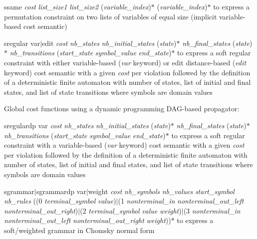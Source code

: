 \documentclass{article}
\begin{document}
\begin{DoxyItemize}
\begin{DoxyItemize}
\item ssame {\itshape cost} {\itshape list\-\_\-size1} {\itshape list\-\_\-size2} ({\itshape variable\-\_\-index})$\ast$ ({\itshape variable\-\_\-index})$\ast$ to express a permutation constraint on two lists of variables of equal size (implicit variable-\/based cost semantic)
\item sregular var$\vert$edit {\itshape cost} {\itshape nb\-\_\-states} {\itshape nb\-\_\-initial\-\_\-states} ({\itshape state})$\ast$ {\itshape nb\-\_\-final\-\_\-states} ({\itshape state})$\ast$ {\itshape nb\-\_\-transitions} ({\itshape start\-\_\-state} {\itshape symbol\-\_\-value} {\itshape end\-\_\-state})$\ast$ to express a soft regular constraint with either variable-\/based ({\itshape var} keyword) or edit distance-\/based ({\itshape edit} keyword) cost semantic with a given {\itshape cost} per violation followed by the definition of a deterministic finite automaton with number of states, list of initial and final states, and list of state transitions where symbols are domain values
\end{DoxyItemize}
\item Global cost functions using a dynamic programming D\-A\-G-\/based propagator\-:
\begin{DoxyItemize}
\item sregulardp var {\itshape cost} {\itshape nb\-\_\-states} {\itshape nb\-\_\-initial\-\_\-states} ({\itshape state})$\ast$ {\itshape nb\-\_\-final\-\_\-states} ({\itshape state})$\ast$ {\itshape nb\-\_\-transitions} ({\itshape start\-\_\-state} {\itshape symbol\-\_\-value} {\itshape end\-\_\-state})$\ast$ to express a soft regular constraint with a variable-\/based ({\itshape var} keyword) cost semantic with a given {\itshape cost} per violation followed by the definition of a deterministic finite automaton with number of states, list of initial and final states, and list of state transitions where symbols are domain values
\item sgrammar$\vert$sgrammardp var$\vert$weight {\itshape cost} {\itshape nb\-\_\-symbols} {\itshape nb\-\_\-values} {\itshape start\-\_\-symbol} {\itshape nb\-\_\-rules} ((0 {\itshape terminal\-\_\-symbol} {\itshape value})$\vert$(1 {\itshape nonterminal\-\_\-in} {\itshape nonterminal\-\_\-out\-\_\-left} {\itshape nonterminal\-\_\-out\-\_\-right})$\vert$(2 {\itshape terminal\-\_\-symbol} {\itshape value} {\itshape weight})$\vert$(3 {\itshape nonterminal\-\_\-in} {\itshape nonterminal\-\_\-out\-\_\-left} {\itshape nonterminal\-\_\-out\-\_\-right} {\itshape weight}))$\ast$ to express a soft/weighted grammar in Chomsky normal form

\end{DoxyItemize}
\end{DoxyItemize}
\end{document}

